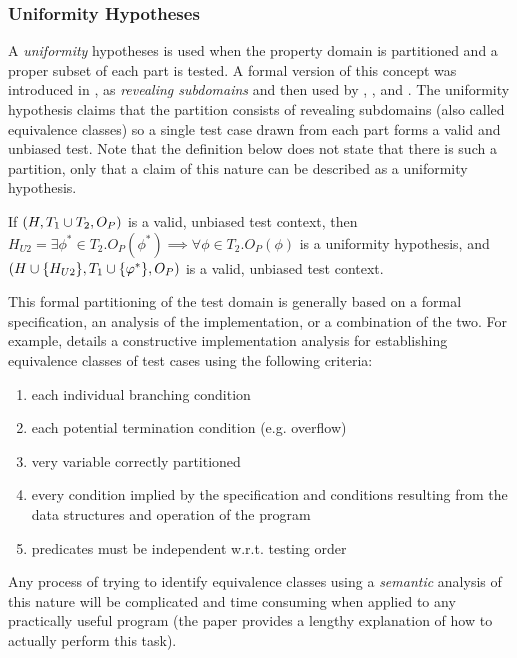 {\subsubsection{Uniformity Hypotheses}\label{sub:uniformity}

A \emph{uniformity} hypotheses is used when the property domain is 
partitioned and a proper subset of each part is tested.
A formal version of this concept was introduced in \cite{WeyukerOstrand1980},
as \emph{revealing subdomains}
and then used by \cite{HamletTaylor1990}, 
\cite{GoodenoughGerhart1975}, and \cite{BernotGaudelMarre1991}.
The uniformity hypothesis claims that
the partition consists of revealing subdomains (also called equivalence classes)
so a single test case drawn from each part forms a valid and unbiased test.
Note that the definition below does not state that there is such a partition,
only that a claim of this nature can be described as a uniformity hypothesis.

\begin{df}
If $(H, T_1 \cup T_2, O_P)$ is a valid, unbiased test context,
then $H_{U2} = \exists \phi^{*} \in T_2. O_P(\phi^{*}) \implies \forall \phi \in T_2. O_P(\phi)$ is a uniformity hypothesis,
and $(H \cup\{H_{U2}\}, T_1 \cup \{\varphi^{*}\}, O_P)$ is a valid, unbiased test context.
\end{df}
\noindent

This formal partitioning of the test domain is
generally based on a formal specification,
an analysis of the implementation,
or a combination of the two.
For example, \cite{BernotGaudelMarre1991} details a constructive implementation analysis for 
establishing equivalence classes of test cases using the following criteria:
\begin{enumerate}
\item each individual branching condition
\item each potential termination condition (e.g. overflow)
\item very variable correctly partitioned
\item every condition implied by the specification
and conditions resulting from the data structures and operation of the program
\item predicates must be independent w.r.t. testing order
\end{enumerate}
\noindent 
Any process of trying to identify equivalence classes using a \emph{semantic} analysis of this nature
will be complicated and time consuming when applied to any practically useful program
(the paper provides a lengthy explanation of how to actually perform this task).

}
